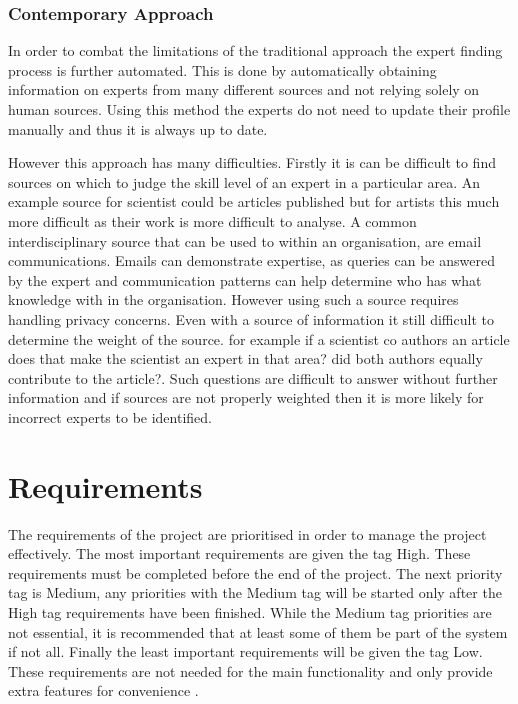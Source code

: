 \documentclass[a4paper,oneside,11pt]{report}
\begin{document}
\subsection{Contemporary Approach}
In order to combat the limitations of the traditional approach the expert finding process is further automated. This is done by automatically obtaining information on experts from many different sources and not relying solely on human sources\autocite{kobsaseid2003}. Using this method the experts do not need to update their profile manually and thus it is always up to date. 

However this approach has many difficulties. Firstly it is can be difficult to find sources on which to judge the skill level of an expert in a particular area. An example source for scientist could be articles published but for artists this much more difficult as their work is more difficult to analyse. A common interdisciplinary source that can be used to within an organisation, are email communications. Emails can demonstrate expertise, as queries can be answered by the expert and communication patterns can help determine who has what knowledge with in the organisation\autocite{campbell2003}. However using such a source requires handling privacy concerns. 
Even with a source of information it still difficult to determine the weight of the source. for example if a scientist co authors an article does that make the scientist an expert in that area? did both authors equally contribute to the article?. Such questions are difficult to answer without further information and if sources are not properly weighted then it is more likely for incorrect experts to be identified.



\chapter{Requirements}
The requirements of the project are prioritised in order to manage the project effectively. The most important requirements are given the tag High. These requirements must be completed before the end of the project. The next priority tag is Medium, any priorities with the Medium tag will be started only after the High tag requirements have been finished. While the Medium tag priorities are not essential, it is recommended that at least some of them be part of the system if not all. Finally the least important requirements will be given the tag Low. These requirements are not needed for the main functionality and only provide extra features for convenience .
\end{document}
